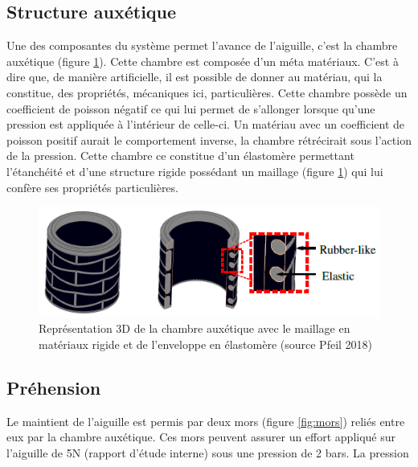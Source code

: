 \documentclass[10pt, a4paper]{article}
\begin{document}
    \subsection{Structure auxétique}
        \qquad Une des composantes du système permet l'avance de l'aiguille, c'est la chambre auxétique (figure \ref{fig:maillageAux}). Cette chambre est composée d'un méta matériaux. C'est à dire que, de manière artificielle, il est possible de donner au matériau, qui la constitue, des propriétés, mécaniques ici, particulières. Cette chambre possède un coefficient de poisson négatif ce qui lui permet de s'allonger lorsque qu'une pression est appliquée à l'intérieur de celle-ci. Un matériau avec un coefficient de poisson positif aurait le comportement inverse, la chambre rétrécirait sous l'action de la pression. Cette chambre ce constitue d'un élastomère permettant l'étanchéité et d'une structure rigide possédant un maillage (figure \ref{fig:maillageAux}) qui lui confère ses propriétés particulières.
        
\begin{figure}[ht!]
\centering
\includegraphics[scale=0.8]{ImageIntro/mailleAux.PNG}
\caption{ Représentation 3D de la chambre auxétique avec le maillage en matériaux rigide et de l'enveloppe en élastomère (source Pfeil 2018) }
\label{fig:maillageAux}
\end{figure} 
        
    \subsection{Préhension}
        \qquad Le maintient de l'aiguille est permis par deux mors (figure \ref{fig:mors}) reliés entre eux par la chambre auxétique. Ces mors peuvent assurer un effort appliqué sur l'aiguille de 5N (rapport d'étude interne) sous une pression de 2 bars. La pression
        
\end{document}
